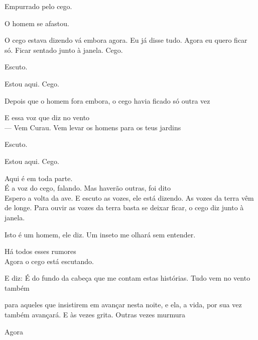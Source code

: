 Empurrado pelo cego.

O homem se afastou.

O cego estava dizendo vá embora agora. Eu já disse tudo. Agora eu quero
ficar só. Ficar sentado junto à janela. Cego.

\pagebreak

\vspace*{4cm}

Escuto.

Estou aqui. Cego.

\pagebreak

\vspace*{4cm}

Depois que o homem fora embora, o cego havia ficado só outra vez

\pagebreak

\vspace*{4cm}

E essa voz que diz no vento\\

--- Vem Curau. Vem levar os homens para os teus jardins

\pagebreak

\vspace*{4cm}

Escuto.

Estou aqui. Cego.

Aqui é em toda parte.\\

É a voz do cego, falando. Mas haverão outras, foi dito\\

Espero a volta da ave. E escuto as vozes, ele está dizendo. As vozes da
terra vêm de longe. Para ouvir as vozes da terra basta se deixar ficar,
o cego diz junto à janela.

Isto é um homem, ele diz. Um inseto me olhará sem entender.

Há todos esses rumores\\

Agora o cego está escutando.

E diz: É do fundo da cabeça que me contam estas histórias. Tudo vem no
vento também

para aqueles que insistirem em avançar nesta noite, e ela, a vida, por
sua vez também avançará. E às vezes grita. Outras vezes murmura

\pagebreak

\vspace*{4cm}

Agora

